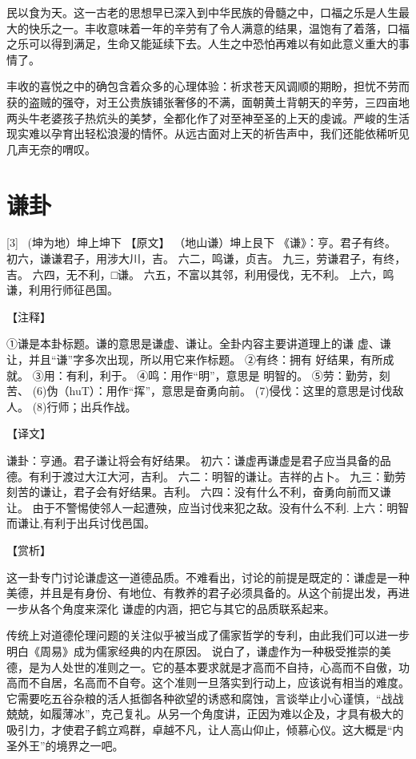 \documentclass[12pt,UTF8]{ctexbook}
\begin{document}
民以食为天。这一古老的思想早已深入到中华民族的骨髓之中，口福之乐是人生最大的快乐之一。丰收意味着一年的辛劳有了令人满意的结果，温饱有了着落，口福之乐可以得到满足，生命又能延续下去。人生之中恐怕再难以有如此意义重大的事情了。

丰收的喜悦之中的确包含着众多的心理体验：祈求苍天风调顺的期盼，担忧不劳而获的盗贼的强夺，对王公贵族铺张奢侈的不满，面朝黄土背朝天的辛劳，三四亩地两头牛老婆孩子热炕头的美梦，全都化作了对至神至圣的上天的虔诚。严峻的生活现实难以孕育出轻松浪漫的情怀。从远古面对上天的祈告声中，我们还能依稀听见几声无奈的喟叹。

\chapter{谦卦}
[3] \ (坤为地）坤上坤下
【原文】
（地山谦）坤上艮下
《谦》：亨。君子有终。
初六，谦谦君子，用涉大川，吉。
六二，鸣谦，贞吉。
九三，劳谦君子，有终，吉。
六四，无不利，□谦。
六五，不富以其邻，利用侵伐，无不利。
上六，鸣谦，利用行师征邑国。

【注释】

①谦是本卦标题。谦的意思是谦虚、谦让。全卦内容主要讲道理上的谦 虚、谦让，并且“谦”字多次出现，所以用它来作标题。
②有终：拥有 好结果，有所成就。
③用：有利，利于。
④鸣：用作“明”，意思是 明智的。
⑤劳：勤劳，刻苦、
(6)伪（huT）：用作“挥”，意思是奋勇向前。
(7)侵伐：这里的意思是讨伐敌人。
(8)行师；出兵作战。

【译文】

谦卦：亨通。君子谦让将会有好结果。
初六：谦虚再谦虚是君子应当具备的品德。有利于渡过大江大河，吉利。
六二：明智的谦让。吉祥的占卜。
九三：勤劳刻苦的谦让，君子会有好结果。吉利。
六四：没有什么不利，奋勇向前而又谦让。 由于不警惕使邻人一起遭殃，应当讨伐来犯之敌。没有什么不利.
上六：明智而谦让,有利于出兵讨伐邑国。

【赏析】

这一卦专门讨论谦虚这一道德品质。不难看出，讨论的前提是既定的：谦虚是一种美德，并且是有身份、有地位、有教养的君子必须具备的。从这个前提出发，再进一步从各个角度来深化 谦虚的内涵，把它与其它的品质联系起来。

传统上对道德伦理问题的关注似乎被当成了儒家哲学的专利，由此我们可以进一步明白《周易》成为儒家经典的内在原因。 说白了，谦虚作为一种极受推崇的美德，是为人处世的准则之一。它的基本要求就是才高而不自持，心高而不自傲，功高而不自居，名高而不自夸。这个准则一旦落实到行动上，应该说有相当的难度。它需要吃五谷杂粮的活人抵御各种欲望的诱惑和腐蚀，言谈举止小心谨慎，“战战兢兢，如履薄冰”，克己复礼。从另一个角度讲，正因为难以企及，才具有极大的吸引力，才使君子鹤立鸡群，卓越不凡，让人高山仰止，倾慕心仪。这大概是“内圣外王”的境界之一吧。
\end{document}
